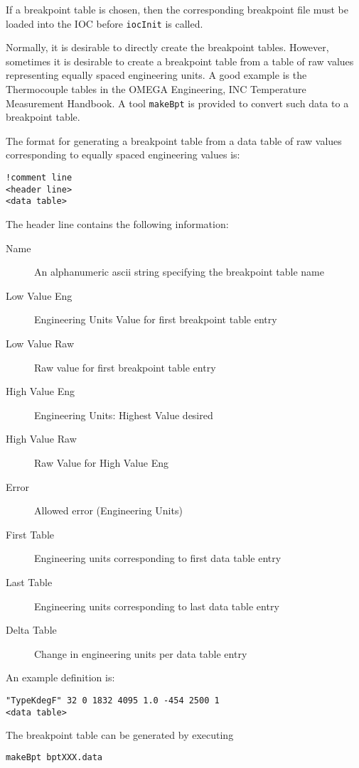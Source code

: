 If a breakpoint table is chosen, then the corresponding breakpoint file must be loaded into the IOC before \verb|iocInit| is called.

Normally, it is desirable to directly create the breakpoint tables.
However, sometimes it is desirable to create a breakpoint table from a table of raw values representing equally spaced engineering units.
A good example is the Thermocouple tables in the OMEGA Engineering, INC Temperature Measurement Handbook.
A tool \verb|makeBpt| is provided to convert such data to a breakpoint table.

The format for generating a breakpoint table from a data table of raw values corresponding to equally spaced engineering values is:

\begin{verbatim}
!comment line
<header line>
<data table>
\end{verbatim}

The header line contains the following information:

\begin{description}
\item [Name] An alphanumeric ascii string specifying the breakpoint table name
\item [Low Value Eng] Engineering Units Value for first breakpoint table entry
\item [Low Value Raw] Raw value for first breakpoint table entry
\item [High Value Eng] Engineering Units: Highest Value desired
\item [High Value Raw] Raw Value for High Value Eng
\item [Error] Allowed error (Engineering Units)
\item [First Table] Engineering units corresponding to first data table entry
\item [Last Table] Engineering units corresponding to last data table entry
\item [Delta Table] Change in engineering units per data table entry
\end{description}

 An example definition is:

\begin{verbatim}
"TypeKdegF" 32 0 1832 4095 1.0 -454 2500 1
<data table>
\end{verbatim}

The breakpoint table can be generated by executing

\begin{lstlisting}[language=sh]
makeBpt bptXXX.data
\end{lstlisting}

